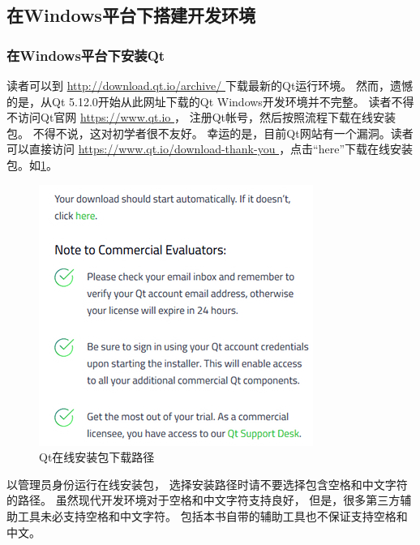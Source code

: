 ﻿%




%


\subsection{
在Windows平台下搭建开发环境
}\label{s000110}



\subsubsection{
在Windows平台下安装Qt
}\label{ss000110}


读者可以到 \url{http://download.qt.io/archive/
}
下载最新的Qt运行环境。
然而，遗憾的是，从Qt 5.12.0开始从此网址下载的Qt Windows开发环境并不完整。
读者不得不访问Qt官网 \url{https://www.qt.io
}，
注册Qt帐号，然后按照流程下载在线安装包。
不得不说，这对初学者很不友好。
幸运的是，目前Qt网站有一个漏洞。读者可以直接访问
 \url{https://www.qt.io/download-thank-you
}，点击“here”下载在线安装包。如\figurename\;\ref{p000000}。

\begin{figure}[ht] %
\centering %
\includegraphics[scale=0.95]{chapter01/images/windows_download_here.png} %
\caption{Qt在线安装包下载路径} %
\label{p000000} %
\end{figure}

以管理员身份运行在线安装包，
选择安装路径时请不要选择包含空格和中文字符的路径。
虽然现代开发环境对于空格和中文字符支持良好，
但是，很多第三方辅助工具未必支持空格和中文字符。
包括本书自带的辅助工具也不保证支持空格和中文。

